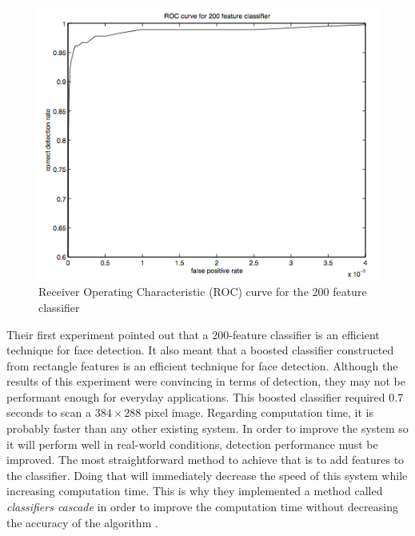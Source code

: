 \begin{figure}[!h]
\begin{center}
\noindent \includegraphics[scale=0.8]{figures/haar_feature_example_result} 
\newline
\caption{Receiver Operating Characteristic (ROC) curve for the 200 feature classifier \cite{VIO01}}
\label{haar_feature_example_result}
\end{center} 
\end{figure}

\noindent Their first experiment pointed out that a 200-feature classifier is an efficient technique for face detection. It also meant that a boosted classifier constructed from rectangle features is an efficient technique for face detection. Although the results of this experiment were convincing in terms of detection, they may not be performant enough for everyday applications. This boosted classifier required 0.7 seconds to scan a $ 384\times288 $ pixel image. Regarding computation time, it is probably faster than any other existing system. In order to improve the system so it will perform well in real-world conditions, detection performance must be improved. The most straightforward method to achieve that is to add features to the classifier. Doing that will immediately decrease the speed of this system while increasing computation time. This is why they implemented a method called \textit{classifiers cascade} in order to improve the computation time without decreasing the accuracy of the algorithm \cite{VIO01}.
\newline

